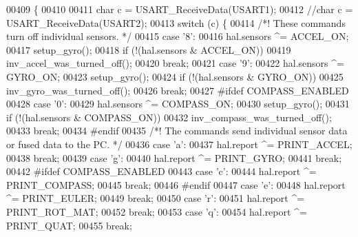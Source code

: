 \begin{DoxyCode}
{{{{{{{{00409 \{
00410 
00411     \textcolor{keywordtype}{char} c = USART_ReceiveData(USART1);
00412     \textcolor{comment}{//char c = USART\_ReceiveData(USART2);}
00413     \textcolor{keywordflow}{switch} (c) \{
00414     \textcolor{comment}{/*! These commands turn off individual sensors. */}
00415     \textcolor{keywordflow}{case} \textcolor{stringliteral}{'8'}:
00416         hal.sensors ^= ACCEL_ON;
00417         setup_gyro();
00418         \textcolor{keywordflow}{if} (!(hal.sensors & ACCEL_ON))
00419             inv\_accel\_was\_turned\_off();
00420         \textcolor{keywordflow}{break};
00421     \textcolor{keywordflow}{case} \textcolor{stringliteral}{'9'}:
00422         hal.sensors ^= GYRO_ON;
00423         setup_gyro();
00424         \textcolor{keywordflow}{if} (!(hal.sensors & GYRO_ON))
00425             inv\_gyro\_was\_turned\_off();
00426         \textcolor{keywordflow}{break};
00427 \textcolor{preprocessor}{#}\textcolor{preprocessor}{ifdef} \textcolor{preprocessor}{COMPASS\_ENABLED}
00428     \textcolor{keywordflow}{case} \textcolor{stringliteral}{'0'}:
00429         hal.sensors ^= COMPASS\_ON;
00430         setup\_gyro();
00431         \textcolor{keywordflow}{if} (!(hal.sensors & COMPASS\_ON))
00432             inv\_compass\_was\_turned\_off();
00433         \textcolor{keywordflow}{break};
00434 \textcolor{preprocessor}{#}\textcolor{preprocessor}{endif}
00435     \textcolor{comment}{/*! The commands send individual sensor data or fused data to the PC. */}
00436     \textcolor{keywordflow}{case} \textcolor{stringliteral}{'a'}:
00437         hal.report ^= PRINT_ACCEL;
00438         \textcolor{keywordflow}{break};
00439     \textcolor{keywordflow}{case} \textcolor{stringliteral}{'g'}:
00440         hal.report ^= PRINT_GYRO;
00441         \textcolor{keywordflow}{break};
00442 \textcolor{preprocessor}{#}\textcolor{preprocessor}{ifdef} \textcolor{preprocessor}{COMPASS\_ENABLED}
00443     \textcolor{keywordflow}{case} \textcolor{stringliteral}{'c'}:
00444         hal.report ^= PRINT\_COMPASS;
00445         \textcolor{keywordflow}{break};
00446 \textcolor{preprocessor}{#}\textcolor{preprocessor}{endif}
00447     \textcolor{keywordflow}{case} \textcolor{stringliteral}{'e'}:
00448         hal.report ^= PRINT_EULER;
00449         \textcolor{keywordflow}{break};
00450     \textcolor{keywordflow}{case} \textcolor{stringliteral}{'r'}:
00451         hal.report ^= PRINT_ROT_MAT;
00452         \textcolor{keywordflow}{break};
00453     \textcolor{keywordflow}{case} \textcolor{stringliteral}{'q'}:
00454         hal.report ^= PRINT_QUAT;
00455         \textcolor{keywordflow}{break};
}}}}}}}}
\end{DoxyCode}
